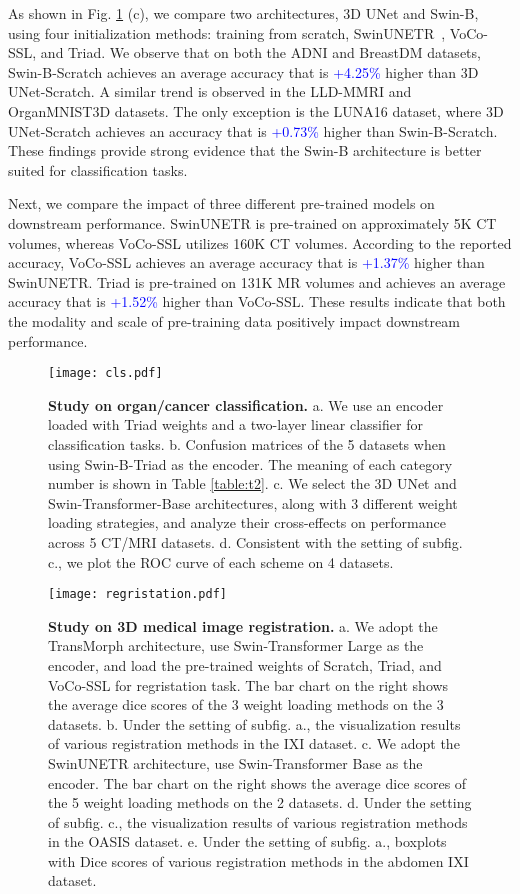As shown in Fig. \ref{fig:cls} (c), we compare two architectures, 3D UNet and Swin-B, using four initialization methods: training from scratch, SwinUNETR~\cite{cao2022swin}, VoCo-SSL, and Triad.
We observe that on both the ADNI and BreastDM datasets, Swin-B-Scratch achieves an average accuracy that is \textcolor{blue}{+4.25\%} higher than 3D UNet-Scratch. A similar trend is observed in the LLD-MMRI and OrganMNIST3D datasets.
The only exception is the LUNA16 dataset, where 3D UNet-Scratch achieves an accuracy that is \textcolor{blue}{+0.73\%} higher than Swin-B-Scratch.
These findings provide strong evidence that the Swin-B architecture is better suited for classification tasks.

Next, we compare the impact of three different pre-trained models on downstream performance.
SwinUNETR is pre-trained on approximately 5K CT volumes, whereas VoCo-SSL utilizes 160K CT volumes. According to the reported accuracy, VoCo-SSL achieves an average accuracy that is \textcolor{blue}{+1.37\%} higher than SwinUNETR.
Triad is pre-trained on 131K MR volumes and achieves an average accuracy that is \textcolor{blue}{+1.52\%} higher than VoCo-SSL.
These results indicate that both the modality and scale of pre-training data positively impact downstream performance.


\begin{figure}[!ht] 
	\centering
	\texttt{[image: cls.pdf]}
	\caption{\textbf{Study on organ/cancer classification.} a. We use an encoder loaded with Triad weights and a two-layer linear classifier for classification tasks. b. Confusion matrices of the 5 datasets when using Swin-B-Triad as the encoder. The meaning of each category number is shown in Table \ref{table:t2}. c. We select the 3D UNet and Swin-Transformer-Base architectures, along with 3 different weight loading strategies, and analyze their cross-effects on performance across 5 CT/MRI datasets. d. Consistent with the setting of subfig. c., we plot the ROC curve of each scheme on 4 datasets.}
	\label{fig:cls} 
\end{figure}


\begin{figure}[!t] 
	\centering
	\texttt{[image: regristation.pdf]}
	\caption{\textbf{Study on 3D medical image registration.} a. We adopt the TransMorph architecture, use Swin-Transformer Large as the encoder, and load the pre-trained weights of Scratch, Triad, and VoCo-SSL for regristation task. The bar chart on the right shows the average dice scores of the 3 weight loading methods on the 3 datasets. b. Under the setting of subfig. a., the visualization results of various registration methods in the IXI dataset. c. We adopt the SwinUNETR architecture, use Swin-Transformer Base as the encoder. The bar chart on the right shows the average dice scores of the 5 weight loading methods on the 2 datasets. d. Under the setting of subfig. c., the visualization results of various registration methods in the OASIS dataset. e. Under the setting of subfig. a., boxplots with Dice scores of various registration methods in the abdomen IXI dataset.}
	\label{fig:registration} 
\end{figure}


